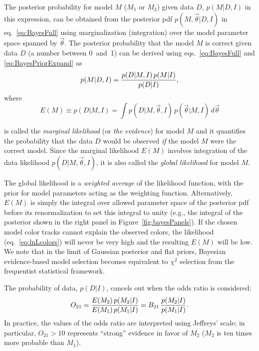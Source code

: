 The posterior probability for model $M$ ($M_1$ or $M_2$) given data $D$, $p(M|D,I)$  in this
expression, can be obtained from the posterior pdf $p(M,\vec{\theta}|D,I)$ in eq.~\ref{eq:BayesFull}
using marginalization (integration) over the model parameter space spanned by $\vec{\theta}$.
The posterior probability that the model $M$ is correct given data $D$ (a number between 0~and~1)
can be derived using eqs.~\ref{eq:BayesFull} and \ref{eq:BayesPriorExpand} as
\begin{equation}
             p(M|D,I) =  {p(D|M,I) \, p(M|I) \over p(D|I)},
\end{equation}           
where
\begin{equation}
\label{eq:evidence}
       E(M) \equiv p(D|M,I) = \int p(D|M,\vec{\theta},I) \, p(\vec{\theta}|M,I) \, d \vec{\theta}
\end{equation}
     
is called the {\it marginal likelihood} (or {\it the evidence}) for model $M$ and it quantifies the 
probability that the data $D$ would be observed {\it if} the model $M$ were the correct model.
Since the marginal likelihood $E(M)$ involves integration of the data likelihood $p(D|M,\vec{\theta},I)$,
it is also called the {\it global likelihood} for model $M$.

The global likelihood is a {\it weighted average} of the likelihood function, with the prior for model parameters
acting as the weighting function. Alternatively, $E(M)$ is simply the integral over allowed parameter space of
the posterior pdf before its renormalization to set this integral to unity (e.g., the integral of the posterior shown
in the right panel in Figure~\ref{fig:bayesPanels}). If the chosen model color tracks cannot explain the observed
colors, the likelihood (eq.~\ref{eq:lnLcolors}) will never be very high and the resulting $E(M)$ will be low.
We note that in the limit of Gaussian posterior and flat priors, Bayesian evidence-based model selection becomes
equivalent to $\chi^2$ selection from the frequentist statistical framework. 

The probability of data, $p(D|I)$, cancels out when the odds ratio is considered: 
\begin{equation}
       O_{21} =  {E(M_2) \, p(M_2|I) \over E(M_1) \, p(M_1|I)} =
       B_{21} \, {p(M_2|I) \over p(M_1|I)}. 
\end{equation}
In practice, the values of the odds ratio are interpreted using Jeffreys' scale; in particular, $O_{21}>10$ represents
``strong'' evidence in favor of $M_2$ ($M_2$ is ten times more probable than $M_1$).
     
